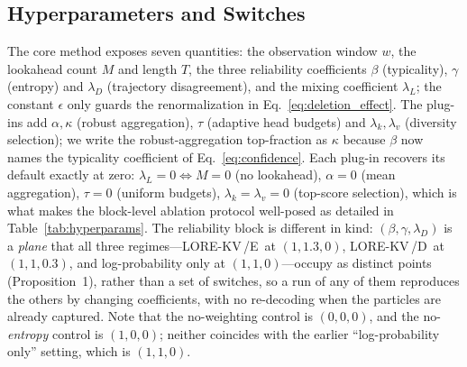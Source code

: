 \documentclass{article} %
\newcommand{\lorekvE}{LORE-KV\,/E}
\newcommand{\lorekvD}{LORE-KV\,/D}
\begin{document}
\subsection{Hyperparameters and Switches}
\label{app:hyperparams}
\label{app:score_details}

The core method exposes seven quantities: the observation window $w$, the lookahead count $M$ and length $T$, the three reliability coefficients $\beta$ (typicality), $\gamma$ (entropy) and $\lambda_D$ (trajectory disagreement), and the mixing coefficient $\lambda_L$; the constant $\epsilon$ only guards the renormalization in Eq.~\eqref{eq:deletion_effect}. The plug-ins add $\alpha,\kappa$ (robust aggregation), $\tau$ (adaptive head budgets) and $\lambda_k,\lambda_v$ (diversity selection); we write the robust-aggregation top-fraction as $\kappa$ because $\beta$ now names the typicality coefficient of Eq.~\eqref{eq:confidence}. Each plug-in recovers its default exactly at zero: $\lambda_L{=}0\Leftrightarrow M{=}0$ (no lookahead), $\alpha{=}0$ (mean aggregation), $\tau{=}0$ (uniform budgets), $\lambda_k{=}\lambda_v{=}0$ (top-score selection), which is what makes the block-level ablation protocol well-posed as detailed in Table~\ref{tab:hyperparams}. The reliability block is different in kind: $(\beta,\gamma,\lambda_D)$ is a \emph{plane} that all three regimes---\lorekvE\ at $(1,1.3,0)$, \lorekvD\ at $(1,1,0.3)$, and log-probability only at $(1,1,0)$---occupy as distinct points (Proposition~1), rather than a set of switches, so a run of any of them reproduces the others by changing coefficients, with no re-decoding when the particles are already captured. Note that the no-weighting control is $(0,0,0)$, and the no-\emph{entropy} control is $(1,0,0)$; neither coincides with the earlier ``log-probability only'' setting, which is $(1,1,0)$.
\end{document}

